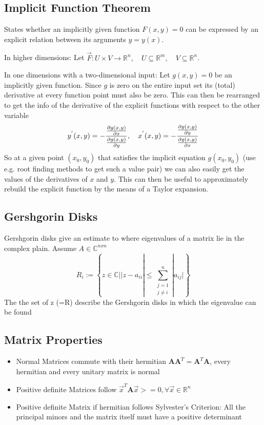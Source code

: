 \documentclass[
    a4paper,
    11pt
]{article}
\begin{document}
\subsection{Implicit Function Theorem}

States whether an implicitly given function $F(x, y) = 0$ can be expressed by an
explicit relation between its arguments $y = y(x)$.

In higher dimensions: Let $\vec{F}: U \times V \to \mathbb{R}^n, \quad U
\subseteq \mathbb{R}^m, \quad V \subseteq \mathbb{R}^n$.

In one dimensions with a two-dimensional input: Let $g(x, y) = 0$ be an
implicitly given function. Since $g$ is zero on the entire input set its (total)
derivative at every function point must also be zero. This can then be
rearranged to get the info of the derivative of the explicit functions with
respect to the other variable
\begin{equation}
    y^{'}(x, y) = - \frac{\pdv{g(x, y)}{x}}{\pdv{g(x, y)}{y}}, \quad
    x^{'}(x, y) = - \frac{\pdv{g(x, y)}{y}}{\pdv{g(x, y)}{x}}
\end{equation}
So at a given point $(x_0, y_0)$ that satisfies the implicit equation $g(x_0,
y_0)$ (use e.g. root finding methods to get such a value pair) we can also
easily get the values of the derivatives of $x$ and $y$. This can then be useful
to approximately rebuild the explicit function by the means of a Taylor
expansion.


\subsection{Gershgorin Disks}

Gershgorin disks give an estimate to where eigenvalues of a matrix lie in the
complex plain. Assume $A \in \mathbb{C}^{n x n}$
\begin{equation}
    R_i := \left\{z \in{} \mathbb{C} |
    |z - a_{ii}| \leq{} \sum_{\substack{j=1 \\ j\neq{} i}}^{n}|a_{ij}| \right\}
\end{equation}
The the set of z (=R) describe the Gershgorin disks in which the eigenvalue can
be found

\subsection{Matrix Properties}

\begin{itemize}
    \item Normal Matrices commute with their hermitian $\mathbf{AA}^T =
        \mathbf{A}^T \mathbf{A}$, every hermitian and every unitary matrix is
        normal
    \item Positive definite Matrices follow $\vec{x}^T \mathbf{A} \vec{x} > =0,
        \forall \vec{x} \in \mathbb{R}^n$
    \item Positive definite Matrix if hermitian follows Sylvester's Criterion:
        All the principal minors and the matrix itself must have a positive
        determinant
\end{itemize}
\end{document}
